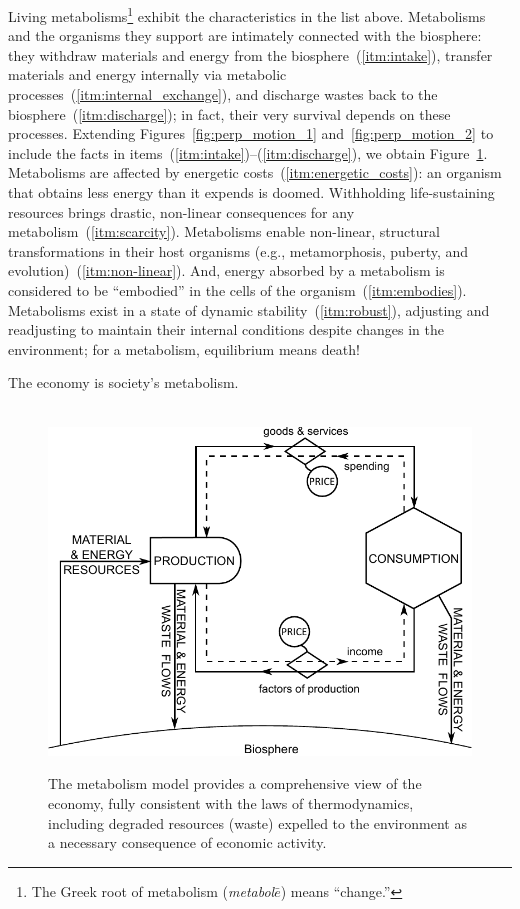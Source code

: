 Living metabolisms\footnote{The 
	Greek root of metabolism 
	(\emph{metabol$\bar{e}$}) means ``change.''}
exhibit the characteristics in the list above.
Metabolisms and the organisms they support
are intimately connected with the biosphere:
they withdraw materials and energy from the biosphere~(\ref{itm:intake}), 
transfer materials and energy internally via metabolic processes~(\ref{itm:internal_exchange}),
and discharge wastes back to the biosphere~(\ref{itm:discharge});
in fact, their very survival depends on these processes.
Extending Figures~\ref{fig:perp_motion_1} and~\ref{fig:perp_motion_2}
to include the facts in items~(\ref{itm:intake})--(\ref{itm:discharge}), %
we obtain Figure~\ref{fig:metabolic_economy}.
Metabolisms are affected by energetic costs~(\ref{itm:energetic_costs}): 
an organism that obtains less energy than it expends is doomed.
Withholding life-sustaining resources brings drastic, non-linear
consequences for any metabolism~(\ref{itm:scarcity}).
Metabolisms enable non-linear, structural transformations
in their host organisms (e.g., metamorphosis, puberty, and evolution)~(\ref{itm:non-linear}).
And, energy absorbed by a metabolism is considered to be ``embodied''
in the cells of the organism~(\ref{itm:embodies}).
Metabolisms exist in a state of dynamic stability~(\ref{itm:robust}),
adjusting and readjusting to maintain their internal conditions
despite changes in the environment;
for a metabolism, equilibrium means death!

The economy is society's metabolism.\cite{F-K1998, Giampietro2000, Giampietro2013}

\begin{figure}[!ht]
\centering\
\includegraphics[width=\linewidth]{Part_0/Chapter_Introduction/images/PERKS.pdf}
\caption[The metabolism model]{The metabolism model provides a comprehensive view 
of the economy, fully consistent with the laws of thermodynamics, 
including degraded resources (waste) expelled 
to the environment as a necessary consequence of economic activity.}
\label{fig:metabolic_economy}
\end{figure}


